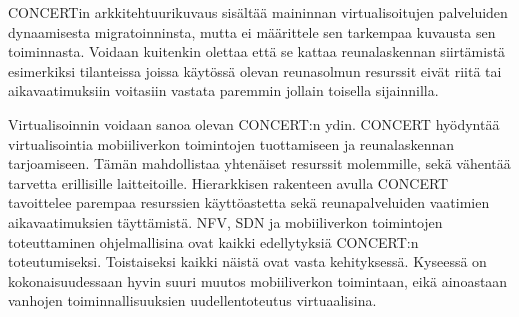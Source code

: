 CONCERTin arkkitehtuurikuvaus sisältää maininnan virtualisoitujen palveluiden dynaamisesta migratoinninsta, mutta ei määrittele sen tarkempaa kuvausta sen toiminnasta. Voidaan kuitenkin olettaa että se kattaa reunalaskennan siirtämistä esimerkiksi tilanteissa joissa käytössä olevan reunasolmun resurssit eivät riitä tai aikavaatimuksiin voitasiin vastata paremmin jollain toisella sijainnilla.

Virtualisoinnin voidaan sanoa olevan CONCERT:n ydin. CONCERT hyödyntää virtualisointia mobiiliverkon toimintojen tuottamiseen ja reunalaskennan tarjoamiseen. Tämän mahdollistaa yhtenäiset resurssit molemmille, sekä vähentää tarvetta erillisille laitteitoille.
Hierarkkisen rakenteen avulla CONCERT tavoittelee parempaa resurssien käyttöastetta sekä  reunapalveluiden vaatimien aikavaatimuksien täyttämistä.
NFV, SDN ja mobiiliverkon toimintojen toteuttaminen ohjelmallisina ovat kaikki edellytyksiä CONCERT:n toteutumiseksi. Toistaiseksi kaikki näistä ovat vasta kehityksessä.
Kyseessä on kokonaisuudessaan hyvin suuri muutos mobiiliverkon toimintaan, eikä ainoastaan vanhojen toiminnallisuuksien uudellentoteutus virtuaalisina.

